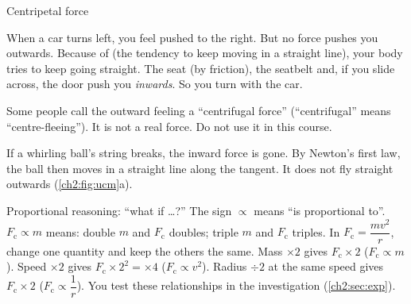\begin{formulacard}{Centripetal force}
  \begin{symbols}
  \end{symbols}
\end{formulacard}

When a car turns left, you feel pushed to the right. But no force pushes you outwards.
Because of  (the tendency to keep moving in a straight line), your body tries
to keep going straight. The seat (by friction), the seatbelt and, if you slide across, the
door push you \emph{inwards}. So you turn with the car.

Some people call the outward feeling a ``centrifugal force'' (``centrifugal'' means
``centre-fleeing''). It is not a real force. Do not use it in this course.

If a whirling ball's string breaks, the inward force is gone. By Newton's first law, the
ball then moves in a straight line along the tangent. It does not fly straight outwards
(\cref{ch2:fig:ucm}a).

\begin{toolkit}{Proportional reasoning: ``what if \ldots?''}
The sign $\propto$ means ``is proportional to''. $F_\mathrm{c} \propto m$ means: double $m$
and $F_\mathrm{c}$ doubles; triple $m$ and $F_\mathrm{c}$ triples.
In $F_\mathrm{c} = \dfrac{mv^2}{r}$, change one quantity and keep the others the same.
Mass $\times 2$ gives $F_\mathrm{c} \times 2$ ($F_\mathrm{c} \propto m$). Speed $\times 2$ gives
$F_\mathrm{c} \times 2^2 = \times 4$ ($F_\mathrm{c} \propto v^2$). Radius $\div 2$ at the same
speed gives $F_\mathrm{c} \times 2$ ($F_\mathrm{c} \propto \dfrac{1}{r}$). You test these
relationships in the investigation (\cref{ch2:sec:exp}).
\end{toolkit}

